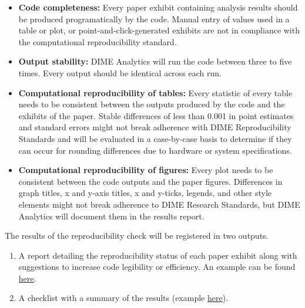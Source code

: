 \begin{fullwidth}
	\begin{itemize}
		\setlength\itemsep{-0.1em}
		\item \textbf{Code completeness:} Every paper exhibit containing analysis results should be produced programatically by the code. Manual entry of values used in a table or plot, or point-and-click-generated exhibits are not in compliance with the computational reproducibility standard.
		\item \textbf{Output stability:} DIME Analytics will run the code between three to five times. Every output should be  identical across each run.
		\item \textbf{Computational reproducibility of tables:} Every statistic of every table needs to be consistent between the outputs produced by the code and the exhibits of the paper. Stable differences of less than 0.001 in point estimates and standard errors might not break adherence with DIME Reproducibility Standards and will be evaluated in a case-by-case basis to determine if they can occur for rounding differences due to hardware or system specifications.
		\item \textbf{Computational reproducibility of figures:} Every plot needs to be consistent between the code outputs and the paper figures. Differences in graph titles, x and y-axis titles, x and y-ticks, legends, and other style elements might not break adherence to DIME Research Standards, but DIME Analytics will document them in the results report.
	\end{itemize}

	\bigskip
	
	The results of the reproducibility check will be registered in two outputs.

	\bigskip

	\begin{enumerate}
		\setlength\itemsep{-0.1em}
		\item A report detailing the reproducibility status of each paper exhibit along with suggestions to increase code legibility or efficiency. An example can be found \href{https://github.com/worldbank/dime-standards/blob/master/dime-research-standards/pillar-3-research-reproducibility/DIME%20Analytics%20Reproducibility%20Check%20Comments%20example.pdf}{here}.
		\item A checklist with a summary of the results (example \href{https://raw.githubusercontent.com/worldbank/dime-standards/master/dime-research-standards/pillar-3-research-reproducibility/checklists/Reproducibility%20check%20result%20template.pdf}{here}).
	\end{enumerate}


\end{fullwidth}
